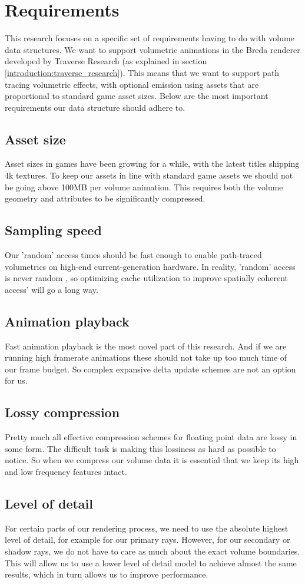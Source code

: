 \section{Requirements} \label{requirements}
This research focuses on a specific set of requirements having to do with volume data structures. We want to support volumetric animations in the Breda renderer developed by Traverse Research (as explained in section \ref{introduction:traverse_research}). This means that we want to support path tracing volumetric effects, with optional emission using assets that are proportional to standard game asset sizes. Below are the most important requirements our data structure should adhere to.
\subsection{Asset size} \label{requirements:asset_size}
Asset sizes in games have been growing for a while, with the latest titles shipping 4k textures. To keep our assets in line with standard game assets we should not be going above 100MB per volume animation. This requires both the volume geometry and attributes to be significantly compressed.
\subsection{Sampling speed} \label{requirements:sampling_speed}
Our 'random' access times should be fast enough to enable path-traced volumetrics on high-end current-generation hardware. In reality, 'random' access is never random \cite{museth2013vdb}, so optimizing cache utilization to improve spatially coherent access' will go a long way.
\subsection{Animation playback} \label{requirements:animation_playback}
Fast animation playback is the most novel part of this research. And if we are running high framerate animations these should not take up too much time of our frame budget. So complex expansive delta update schemes are not an option for us.
\subsection{Lossy compression} \label{requirements:lossy_compression}
Pretty much all effective compression schemes for floating point data are lossy in some form. The difficult task is making this lossiness as hard as possible to notice. So when we compress our volume data it is essential that we keep its high and low frequency features intact.
\subsection{Level of detail} \label{requirements:level_of_detail}
For certain parts of our rendering process, we need to use the absolute highest level of detail, for example for our primary rays. However, for our secondary or shadow rays, we do not have to care as much about the exact volume boundaries. This will allow us to use a lower level of detail model to achieve almost the same results, which in turn allows us to improve performance.
